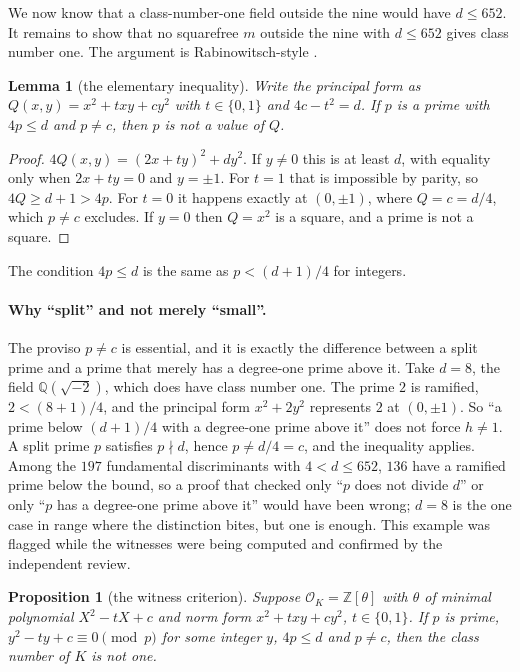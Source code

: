 \documentclass[11pt]{article}
\newtheorem{proposition}[theorem]{Proposition}
\newtheorem{lemma}[theorem]{Lemma}
\theoremstyle{definition}
\newcommand{\Z}{\mathbb{Z}}
\newcommand{\Q}{\mathbb{Q}}
\newcommand{\OK}{\mathcal{O}_K}
\begin{document}
We now know that a class-number-one field outside the nine would have $d \le 652$. It remains to show that no squarefree $m$ outside the nine with $d \le 652$ gives class number one. The argument is Rabinowitsch-style \cite{Rabinowitsch1913}.

\begin{lemma}[the elementary inequality]\label{lem:elem}
Write the principal form as $Q(x,y) = x^2 + txy + cy^2$ with $t \in \{0,1\}$ and $4c - t^2 = d$. If $p$ is a prime with $4p \le d$ and $p \ne c$, then $p$ is not a value of $Q$.
\end{lemma}

\begin{proof}
$4Q(x,y) = (2x+ty)^2 + dy^2$. If $y \ne 0$ this is at least $d$, with equality only when $2x + ty = 0$ and $y = \pm1$. For $t = 1$ that is impossible by parity, so $4Q \ge d + 1 > 4p$. For $t = 0$ it happens exactly at $(0, \pm1)$, where $Q = c = d/4$, which $p \ne c$ excludes. If $y = 0$ then $Q = x^2$ is a square, and a prime is not a square.
\end{proof}

The condition $4p \le d$ is the same as $p < (d+1)/4$ for integers.

\paragraph{Why ``split'' and not merely ``small''.} The proviso $p \ne c$ is essential, and it is exactly the difference between a split prime and a prime that merely has a degree-one prime above it. Take $d = 8$, the field $\Q(\sqrt{-2})$, which does have class number one. The prime $2$ is ramified, $2 < (8+1)/4$, and the principal form $x^2 + 2y^2$ represents $2$ at $(0, \pm1)$. So ``a prime below $(d+1)/4$ with a degree-one prime above it'' does not force $h \ne 1$. A split prime $p$ satisfies $p \nmid d$, hence $p \ne d/4 = c$, and the inequality applies. Among the $197$ fundamental discriminants with $4 < d \le 652$, $136$ have a ramified prime below the bound, so a proof that checked only ``$p$ does not divide $d$'' or only ``$p$ has a degree-one prime above it'' would have been wrong; $d = 8$ is the one case in range where the distinction bites, but one is enough. This example was flagged while the witnesses were being computed and confirmed by the independent review.

\begin{proposition}[the witness criterion]\label{prop:witness}
Suppose $\OK = \Z[\theta]$ with $\theta$ of minimal polynomial $X^2 - tX + c$ and norm form $x^2 + txy + cy^2$, $t \in \{0,1\}$. If $p$ is prime, $y^2 - ty + c \equiv 0 \pmod p$ for some integer $y$, $4p \le d$ and $p \ne c$, then the class number of $K$ is not one.
\end{proposition}
\end{document}
